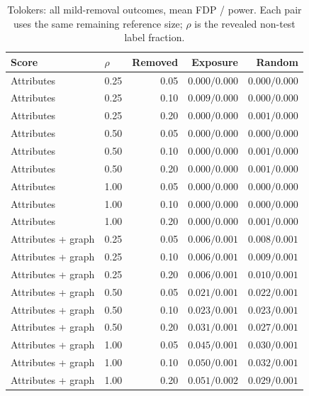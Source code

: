 \begin{table}[ht]\centering\small
\caption{Tolokers: all mild-removal outcomes, mean FDP / power. Each pair uses the same remaining reference size; $\rho$ is the revealed non-test label fraction.}
\begin{tabular}{llrrr}\toprule Score & $\rho$ & Removed & Exposure & Random\\\midrule
Attributes & 0.25 & 0.05 & $0.000/0.000$ & $0.000/0.000$ \\
Attributes & 0.25 & 0.10 & $0.009/0.000$ & $0.000/0.000$ \\
Attributes & 0.25 & 0.20 & $0.000/0.000$ & $0.001/0.000$ \\
Attributes & 0.50 & 0.05 & $0.000/0.000$ & $0.000/0.000$ \\
Attributes & 0.50 & 0.10 & $0.000/0.000$ & $0.001/0.000$ \\
Attributes & 0.50 & 0.20 & $0.000/0.000$ & $0.001/0.000$ \\
Attributes & 1.00 & 0.05 & $0.000/0.000$ & $0.000/0.000$ \\
Attributes & 1.00 & 0.10 & $0.000/0.000$ & $0.000/0.000$ \\
Attributes & 1.00 & 0.20 & $0.000/0.000$ & $0.001/0.000$ \\
Attributes + graph & 0.25 & 0.05 & $0.006/0.001$ & $0.008/0.001$ \\
Attributes + graph & 0.25 & 0.10 & $0.006/0.001$ & $0.009/0.001$ \\
Attributes + graph & 0.25 & 0.20 & $0.006/0.001$ & $0.010/0.001$ \\
Attributes + graph & 0.50 & 0.05 & $0.021/0.001$ & $0.022/0.001$ \\
Attributes + graph & 0.50 & 0.10 & $0.023/0.001$ & $0.023/0.001$ \\
Attributes + graph & 0.50 & 0.20 & $0.031/0.001$ & $0.027/0.001$ \\
Attributes + graph & 1.00 & 0.05 & $0.045/0.001$ & $0.030/0.001$ \\
Attributes + graph & 1.00 & 0.10 & $0.050/0.001$ & $0.032/0.001$ \\
Attributes + graph & 1.00 & 0.20 & $0.051/0.002$ & $0.029/0.001$ \\
\bottomrule\end{tabular}\end{table}
